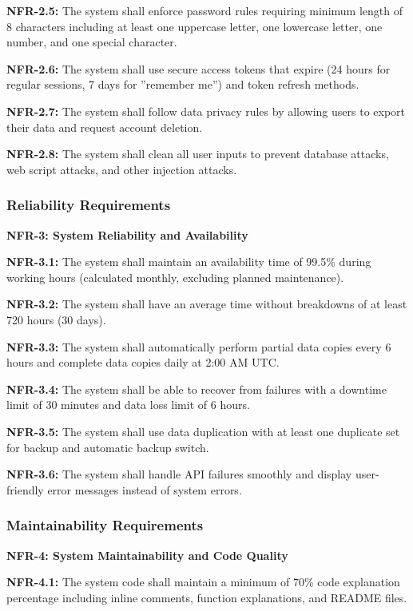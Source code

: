 \documentclass[12pt,a4paper]{article}
\begin{document}
\textbf{NFR-2.5:} The system shall enforce password rules requiring minimum length of 8 characters including at least one uppercase letter, one lowercase letter, one number, and one special character.

\textbf{NFR-2.6:} The system shall use secure access tokens that expire (24 hours for regular sessions, 7 days for ”remember me”) and token refresh methods.

\textbf{NFR-2.7:} The system shall follow data privacy rules by allowing users to export their data and request account deletion.

\textbf{NFR-2.8:} The system shall clean all user inputs to prevent database attacks, web script attacks, and other injection attacks.

\subsubsection{Reliability Requirements}

\textbf{NFR-3: System Reliability and Availability}

\textbf{NFR-3.1:} The system shall maintain an availability time of 99.5\% during working hours (calculated monthly, excluding planned maintenance).

\textbf{NFR-3.2:} The system shall have an average time without breakdowns of at least 720 hours (30 days).

\textbf{NFR-3.3:} The system shall automatically perform partial data copies every 6 hours and complete data copies daily at 2:00 AM UTC.

\textbf{NFR-3.4:} The system shall be able to recover from failures with a downtime limit of 30 minutes and data loss limit of 6 hours.

\textbf{NFR-3.5:} The system shall use data duplication with at least one duplicate set for backup and automatic backup switch.

\textbf{NFR-3.6:} The system shall handle API failures smoothly and display user-friendly error messages instead of system errors.

\subsubsection{Maintainability Requirements}

\textbf{NFR-4: System Maintainability and Code Quality}

\textbf{NFR-4.1:} The system code shall maintain a minimum of 70\% code explanation percentage including inline comments, function explanations, and README files.
\end{document}
